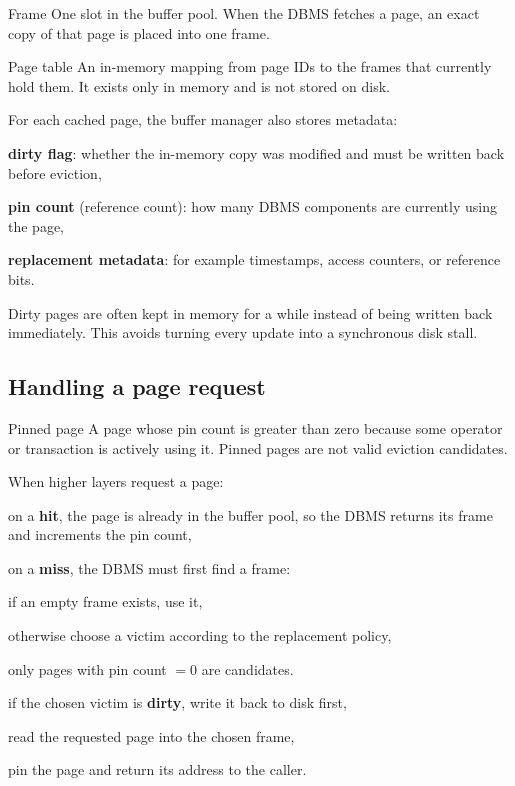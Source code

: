 \documentclass[../../dis.tex]{subfiles}
\begin{document}
\begin{concept}{Frame}
One slot in the buffer pool. When the DBMS fetches a page, an exact copy of that page is placed into one frame.
\end{concept}

\begin{concept}{Page table}
An in-memory mapping from page IDs to the frames that currently hold them. It exists only in memory and is not stored on disk.
\end{concept}

\begin{schema}
{}\par}
\end{schema}

For each cached page, the buffer manager also stores metadata:
\begin{dashlist}
    \item \textbf{dirty flag}: whether the in-memory copy was modified and must be written back before eviction,
    \item \textbf{pin count} (reference count): how many DBMS components are currently using the page,
    \item \textbf{replacement metadata}: for example timestamps, access counters, or reference bits.
\end{dashlist}

Dirty pages are often kept in memory for a while instead of being written back immediately. This avoids turning every update into a synchronous disk stall.

\subsection{Handling a page request}
\begin{concept}{Pinned page}
A page whose pin count is greater than zero because some operator or transaction is actively using it. Pinned pages are not valid eviction candidates.
\end{concept}

When higher layers request a page:
\begin{dashlist}
    \item on a \textbf{hit}, the page is already in the buffer pool, so the DBMS returns its frame and increments the pin count,
    \item on a \textbf{miss}, the DBMS must first find a frame:
    \begin{dashlist}
        \item if an empty frame exists, use it,
        \item otherwise choose a victim according to the replacement policy,
        \item only pages with pin count \(=0\) are candidates.
    \end{dashlist}
    \item if the chosen victim is \textbf{dirty}, write it back to disk first,
    \item read the requested page into the chosen frame,
    \item pin the page and return its address to the caller.
\end{dashlist}
\end{document}

